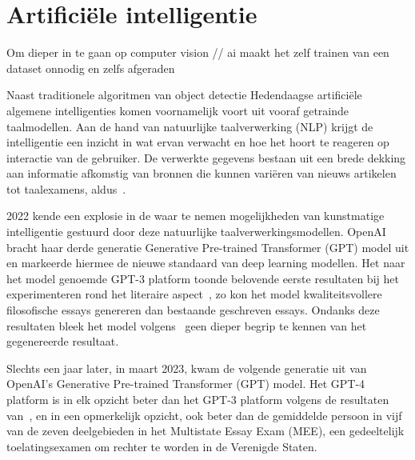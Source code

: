 \section{Artificiële intelligentie}
\label{sec:ls-artificiele-intelligentie}
Om dieper in te gaan op computer vision
// ai maakt het zelf trainen van een dataset onnodig en zelfs afgeraden


Naast traditionele algoritmen van object detectie
Hedendaagse artifici\"ele algemene intelligenties komen voornamelijk voort uit vooraf getrainde taalmodellen.
Aan de hand van natuurlijke taalverwerking (NLP) krijgt de intelligentie een inzicht in wat ervan verwacht en hoe het hoort te reageren op interactie van de gebruiker.
De verwerkte gegevens bestaan uit een brede dekking aan informatie afkomstig van bronnen die kunnen vari\"eren van nieuws artikelen tot taalexamens, aldus~\textcite{Liu2019}.

2022 kende een explosie in de waar te nemen mogelijkheden van kunstmatige intelligentie gestuurd door deze natuurlijke taalverwerkingsmodellen.
OpenAI bracht haar derde generatie Generative Pre-trained Transformer (GPT) model uit en markeerde hiermee de nieuwe standaard van deep learning modellen.
Het naar het model genoemde GPT-3 platform toonde belovende eerste resultaten bij het experimenteren rond het literaire aspect~\autocite{Elkins2020}, zo kon het model kwaliteitsvollere filosofische essays genereren dan bestaande geschreven essays.
Ondanks deze resultaten bleek het model volgens~\textcite{Floridi2020} geen dieper begrip te kennen van het gegenereerde resultaat.

Slechts een jaar later, in maart 2023, kwam de volgende generatie uit van OpenAI's Generative Pre-trained Transformer (GPT) model.
Het GPT-4 platform is in elk opzicht beter dan het GPT-3 platform volgens de resultaten van~\textcite{Katz2023}, en in een opmerkelijk opzicht, ook beter dan de gemiddelde persoon in vijf van de zeven deelgebieden in het Multistate Essay Exam (MEE), een gedeeltelijk toelatingsexamen om rechter te worden in de Verenigde Staten.
